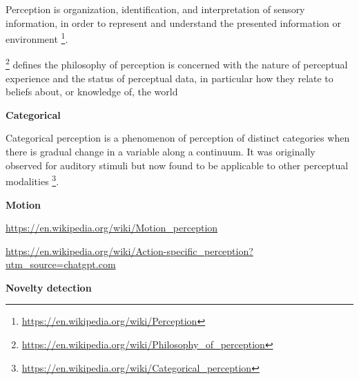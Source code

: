 \documentclass{book}
\providecommand{\ProjectDeepHeading}[2]{%
    \par\medskip\noindent\textbf{#2}\par\smallskip
}
\providecommand{\seeherefooter}[1]{\footnote{\url{#1}}}
\providecommand{\clickurlfooter}[1]{\footnote{\url{#1}}}
\begin{document}
    Perception is organization, identification, and interpretation of sensory information, in order to represent and understand the presented information or environment \seeherefooter{https://en.wikipedia.org/wiki/Perception}.


\clickurlfooter{https://en.wikipedia.org/wiki/Philosophy_of_perception} defines the philosophy of perception is concerned with the nature of perceptual experience and the status of perceptual data, in particular how they relate to beliefs about, or knowledge of, the world

\ProjectDeepHeading{5}{Categorical}


Categorical perception is a phenomenon of perception of distinct categories when there is gradual change in a variable along a continuum. It was originally observed for auditory stimuli but now found to be applicable to other perceptual modalities \seeherefooter{https://en.wikipedia.org/wiki/Categorical_perception}.

\ProjectDeepHeading{5}{Motion}


\url{https://en.wikipedia.org/wiki/Motion_perception}
    
    \url{https://en.wikipedia.org/wiki/Action-specific_perception?utm_source=chatgpt.com}

\ProjectDeepHeading{5}{Novelty detection}

\end{document}
